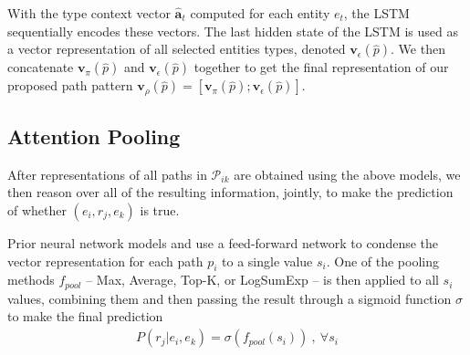 \documentclass[letterpaper]{article} %
\begin{document}


With the type context vector $\hat{\mathbf{a}}_t$ computed for each entity $e_t$, the LSTM sequentially encodes these vectors. The last hidden state of the LSTM is used as a vector representation of all selected entities types, denoted $\bm{v}_\epsilon(\hat{p})$. We then concatenate $\bm{v}_\pi(\hat{p})$ and $\bm{v}_\epsilon(\hat{p})$ together to get the final representation of our proposed path pattern $\bm{v}_\rho(\hat{p}) = [\bm{v}_\pi(\hat{p});\bm{v}_\epsilon(\hat{p})]$.

\subsection{Attention Pooling}

After representations of all paths in $\mathcal{P}_{ik}$ are obtained using the above models, we then reason over all of the resulting information, jointly, to make the prediction of whether $(e_i, r_j, e_k)$ is true. 

Prior neural network models \cite{cvsm} and \cite{chains} use a feed-forward network to condense the vector representation for each path $p_i$ to a single value $s_i$. One of the pooling methods $f_{pool}$ -- Max, Average, Top-K, or LogSumExp -- is then applied to all $s_i$ values, combining them and then passing the result through a sigmoid function $\sigma$ to make the final prediction%
\begin{align}
	P(r_j|e_i, e_k) = \sigma (f_{pool}(s_i))\:,\: \forall s_i
\end{align} %
\end{document}
